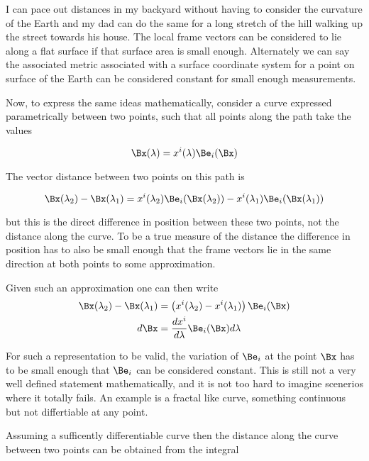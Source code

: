\documentclass{article}      %
\begin{document}
I can pace out distances in my backyard without having to consider the curvature
of the Earth and my dad can do the same for a long stretch of the hill walking up the street towards his house.
The local frame vectors can be considered to lie along a flat surface if that surface area is small enough.
Alternately we can say the associated metric associated with a surface coordinate system for a point on surface of the Earth can be considered constant for small enough measurements.

Now, to express the same ideas mathematically, consider a curve expressed parametrically between two points, such that all
points along the path take the values

\begin{equation*}
\Bx(\lambda) = x^i(\lambda) \Be_i(\Bx)
\end{equation*}

The vector distance between two points on this path is

\begin{equation*}
\Bx(\lambda_2) - \Bx(\lambda_1) = x^i(\lambda_2) \Be_i(\Bx(\lambda_2)) - x^i(\lambda_1) \Be_i(\Bx(\lambda_1))
\end{equation*}

but this is the direct difference in position between these two points, not the distance along the curve.
To be a true measure of the distance the difference in position has to also be small enough that the frame vectors lie in the same direction at both points to some approximation.

Given such an approximation one can then write
\begin{align*}
\Bx(\lambda_2) - \Bx(\lambda_1) &= \left(x^i(\lambda_2) - x^i(\lambda_1)\right) \Be_i(\Bx) \\
d\Bx &= \frac{d x^i}{d\lambda} \Be_i(\Bx) d\lambda \\
\end{align*}

For such a representation to be valid, the variation of $\Be_i$ at the point $\Bx$ has to be small enough that $\Be_i$ can be 
considered constant.  This is still not a very well defined statement mathematically, and it is not too hard to imagine 
scenerios where it totally fails.  An example is a fractal like curve, something continuous but not differtiable at
any point.

Assuming a sufficently differentiable curve then the distance along the curve between two points can be obtained from the
integral
\end{document}
